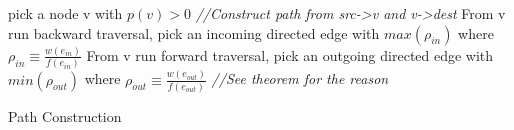 \documentclass[twocolumn]{article}
\begin{document}
\begin{algorithm}\label {Path Construction}
\SetAlgoLined
\BlankLine
pick a node v with $p(v)>0$\;
\emph{//Construct path from src->v and v->dest}\;
From v run backward traversal, pick an incoming directed edge with $ max( \rho_{in} )  $ where $\rho_{in} \equiv \frac{ w(e_{in})}{f(e_{in})}$\;
From v run forward traversal, pick an outgoing directed edge with $ min(\rho_{out} ) $ where $\rho_{out} \equiv \frac{ w(e_{out})}{f(e_{out})} $\;
\emph{//See theorem for the reason}\;
\caption{ Path Construction}
\end{algorithm}
\end{document}
